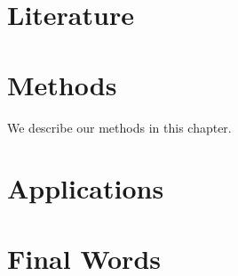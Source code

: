 \documentclass[]{book}
\begin{document}
\hypertarget{literature}{%
\chapter{Literature}\label{literature}}

\hypertarget{methods}{%
\chapter{Methods}\label{methods}}

We describe our methods in this chapter.

\hypertarget{applications}{%
\chapter{Applications}\label{applications}}

\hypertarget{final-words}{%
\chapter{Final Words}\label{final-words}}
\end{document}
